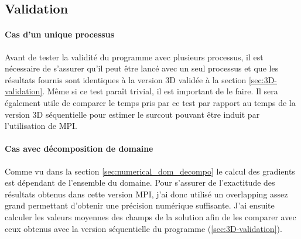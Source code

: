 \subsection{Validation}

\paragraph{Cas d'un unique processus}Avant de tester la validité du programme avec plusieurs processus, il est nécessaire de s'assurer qu'il peut être lancé avec un seul processus et que les résultats fournis sont identiques à la version 3D validée à la section \ref{sec:3D-validation}. Même si ce test paraît trivial, il est important de le faire. Il sera également utile de comparer le temps pris par ce test par rapport au temps de la version 3D séquentielle pour estimer le surcout pouvant être induit par l'utilisation de MPI.

\paragraph{Cas avec décomposition de domaine}
Comme vu dans la section \ref{sec:numerical_dom_decompo} le calcul des gradients est dépendant de l'ensemble du domaine. Pour s'assurer de l'exactitude des résultats obtenus dans cette version MPI, j'ai donc utilisé un overlapping assez grand permettant d'obtenir une précision numérique suffisante. J'ai ensuite calculer les valeurs moyennes des champs de la solution afin de les comparer avec ceux obtenus avec la version séquentielle du programme (\ref{sec:3D-validation}).

%    
